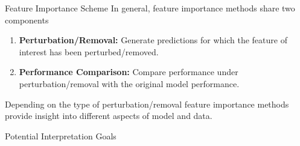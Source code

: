 \begin{vbframe}{Feature Importance Scheme}
In general, feature importance methods share two components
\lz
\begin{enumerate}
  \item \textbf{Perturbation/Removal:} Generate predictions for which the feature of interest has been perturbed/removed.
  \item \textbf{Performance Comparison:} Compare performance under perturbation/removal with the original model performance.
\end{enumerate}
\lz
Depending on the type of perturbation/removal feature importance methods provide insight into different aspects of model and data.
\end{vbframe}


\begin{vbframe}{Potential Interpretation Goals}


\end{vbframe}
